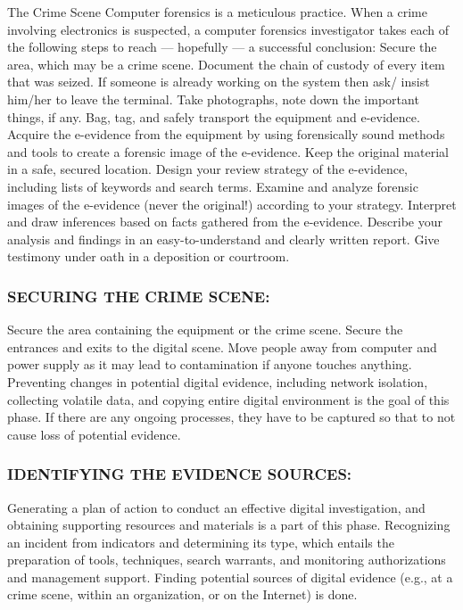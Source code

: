 \documentclass[10pt,british,english]{article}
\begin{document}
The Crime Scene Computer forensics is a meticulous practice. When
a crime involving electronics is suspected, a computer forensics investigator
takes each of the following steps to reach --- hopefully --- a successful
conclusion: Secure the area, which may be a crime scene. Document
the chain of custody of every item that was seized. If someone is
already working on the system then ask/ insist him/her to leave the
terminal. Take photographs, note down the important things, if any.
Bag, tag, and safely transport the equipment and e-evidence. Acquire
the e-evidence from the equipment by using forensically sound methods
and tools to create a forensic image of the e-evidence. Keep the original
material in a safe, secured location. Design your review strategy
of the e-evidence, including lists of keywords and search terms. Examine
and analyze forensic images of the e-evidence (never the original!)
according to your strategy. Interpret and draw inferences based on
facts gathered from the e-evidence. Describe your analysis and findings
in an easy-to-understand and clearly written report. Give testimony
under oath in a deposition or courtroom. 

\subsubsection{SECURING THE CRIME SCENE:}

Secure the area containing the equipment or the crime scene. Secure
the entrances and exits to the digital scene. Move people away from
computer and power supply as it may lead to contamination if anyone
touches anything. Preventing changes in potential digital evidence,
including network isolation, collecting volatile data, and copying
entire digital environment is the goal of this phase. If there are
any ongoing processes, they have to be captured so that to not cause
loss of potential evidence.

\subsubsection{IDENTIFYING THE EVIDENCE SOURCES:}

Generating a plan of action to conduct an effective digital investigation,
and obtaining supporting resources and materials is a part of this
phase. Recognizing an incident from indicators and determining its
type, which entails the preparation of tools, techniques, search warrants,
and monitoring authorizations and management support. Finding potential
sources of digital evidence (e.g., at a crime scene, within an organization,
or on the Internet) is done.
\end{document}
